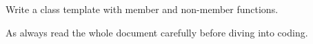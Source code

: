 
\objectives
{
    \begin{enumerate}
        \li Write a class template with member and non-member functions.
    \end{enumerate}
}

As always read the whole document carefully before diving into coding.

